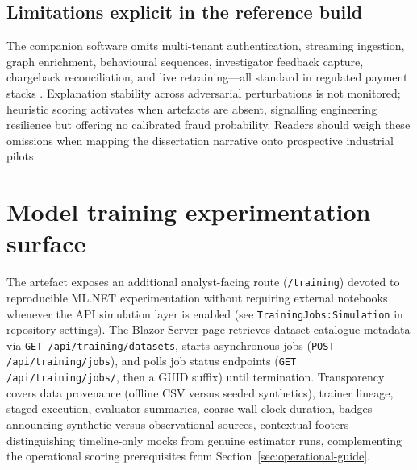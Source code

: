 \subsection{Limitations explicit in the reference build}
The companion software omits multi-tenant authentication, streaming ingestion, graph enrichment, behavioural sequences, investigator feedback capture, chargeback reconciliation, and live retraining—all standard in regulated payment stacks \cite{fraud_handbook,lucas_jurgovsky_ccfraud_survey2020}. Explanation stability across adversarial perturbations is not monitored; heuristic scoring activates when artefacts are absent, signalling engineering resilience but offering no calibrated fraud probability. Readers should weigh these omissions when mapping the dissertation narrative onto prospective industrial pilots.

\section{Model training experimentation surface}
\label{sec:training-surface}

The artefact exposes an additional analyst-facing route (\texttt{/training}) devoted to reproducible ML.NET experimentation without requiring external notebooks whenever the API simulation layer is enabled (see \texttt{TrainingJobs:\allowbreak Simulation} in repository settings). The Blazor Server page retrieves dataset catalogue metadata via \texttt{GET /api/\allowbreak training/\allowbreak datasets}, starts asynchronous jobs (\texttt{POST /api/\allowbreak training/\allowbreak jobs}), and polls job status endpoints (\texttt{GET /api/\allowbreak training/\allowbreak jobs/}, then a GUID suffix) until termination. Transparency covers data provenance (offline CSV versus seeded synthetics), trainer lineage, staged execution, evaluator summaries, coarse wall-clock duration, badges announcing synthetic versus observational sources, contextual footers distinguishing timeline-only mocks from genuine estimator runs, complementing the operational scoring prerequisites from Section~\ref{sec:operational-guide}.

